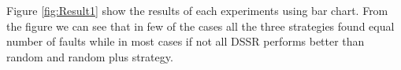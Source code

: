 \documentclass[conference]{IEEEtran}
\begin{document}

Figure \ref{fig:Result1} show the results of each experiments using bar chart. From the figure we can see that in few of the cases all the three strategies found equal number of faults while in most cases if not all DSSR performs better than random and random plus strategy.


\end{document}
